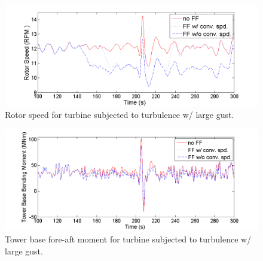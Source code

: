 \begin{figure}[htbp]
	\centering
		\includegraphics[trim = {1cm 0 2cm 0}, clip, width = \linewidth]{Figures/ch4Figures/fig4-28.png}
		
	\caption{Rotor speed for turbine subjected to turbulence w/ large gust.}
	\label{fig4-28}
\end{figure}

\begin{figure}[htbp]
	\centering
		\includegraphics[trim = {1cm 0 2cm 0}, clip, width = \linewidth]{Figures/ch4Figures/fig4-29.png}
		
	\caption{Tower base fore-aft moment for turbine subjected to turbulence w/ large gust.}
	\label{fig4-29}
\end{figure}

